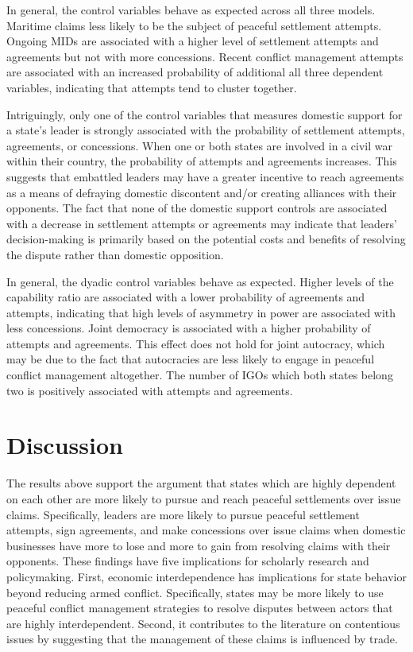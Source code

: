 \documentclass[../../dissertation.tex]{subfiles}
\begin{document}
In general, the control variables behave as expected across all three models. Maritime claims less likely to be the subject of peaceful settlement attempts. Ongoing MIDs are associated with a higher level of settlement attempts and agreements but not with more concessions. Recent conflict management attempts are associated with an increased probability of additional all three dependent variables, indicating that attempts tend to cluster together. 

Intriguingly, only one of the control variables that measures domestic support for a state’s leader is strongly associated with the probability of settlement attempts, agreements, or concessions. When one or both states are involved in a civil war within their country, the probability of attempts and agreements increases. This suggests that embattled leaders may have a greater incentive to reach agreements as a means of defraying domestic discontent and/or creating alliances with their opponents. The fact that none of the domestic support controls are associated with a decrease in settlement attempts or agreements may indicate that leaders’ decision-making is primarily based on the potential costs and benefits of resolving the dispute rather than domestic opposition.

In general, the dyadic control variables behave as expected. Higher levels of the capability ratio are associated with a lower probability of agreements and attempts, indicating that high levels of asymmetry in power are associated with less concessions. Joint democracy is associated with a higher probability of attempts and agreements. This effect does not hold for joint autocracy, which may be due to the fact that autocracies are less likely to engage in peaceful conflict management altogether. The number of IGOs which both states belong two is positively associated with attempts and agreements.

\section{Discussion}

The results above support the argument that states which are highly dependent on each other are more likely to pursue and reach peaceful settlements over issue claims. Specifically, leaders are more likely to pursue peaceful settlement attempts, sign agreements, and make concessions over issue claims when domestic businesses have more to lose and more to gain from resolving claims with their opponents. These findings have five implications for scholarly research and policymaking. First, economic interdependence has implications for state behavior beyond reducing armed conflict. Specifically, states may be more likely to use peaceful conflict management strategies to resolve disputes between actors that are highly interdependent. Second, it contributes to the literature on contentious issues by suggesting that the management of these claims is influenced by trade. 
\end{document}
